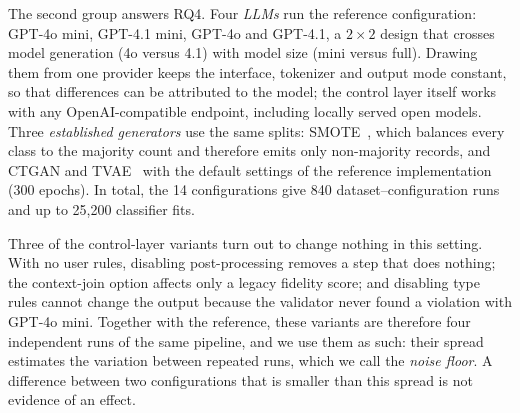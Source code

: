 \documentclass[conference]{IEEEtran}
\begin{document}
The second group answers RQ4. Four \emph{LLMs} run the reference configuration: GPT-4o mini, GPT-4.1 mini, GPT-4o and GPT-4.1, a $2\times2$ design that crosses model generation (4o versus 4.1) with model size (mini versus full). Drawing them from one provider keeps the interface, tokenizer and output mode constant, so that differences can be attributed to the model; the control layer itself works with any OpenAI-compatible endpoint, including locally served open models. Three \emph{established generators} use the same splits: SMOTE~\cite{chawla2002smote}, which balances every class to the majority count and therefore emits only non-majority records, and CTGAN and TVAE~\cite{xu2019ctgan} with the default settings of the reference implementation (300 epochs). In total, the 14 configurations give 840 dataset--configuration runs and up to 25,200 classifier fits.

Three of the control-layer variants turn out to change nothing in this setting. With no user rules, disabling post-processing removes a step that does nothing; the context-join option affects only a legacy fidelity score; and disabling type rules cannot change the output because the validator never found a violation with GPT-4o mini. Together with the reference, these variants are therefore four independent runs of the same pipeline, and we use them as such: their spread estimates the variation between repeated runs, which we call the \emph{noise floor}. A difference between two configurations that is smaller than this spread is not evidence of an effect.
\end{document}
